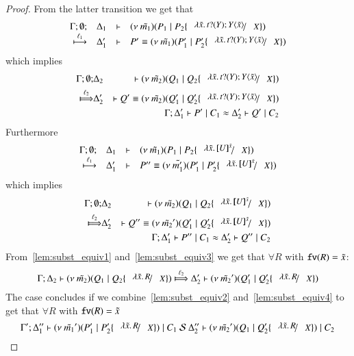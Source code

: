 \begin{proof}
	\noi From the latter transition we get that
%
\[
		\mhorel{\Gamma}{\Delta_1}{\newsp{\tilde{m_1}}{P_1 \Par P_2 \subst{\abs{\tilde{x}}{\binp{t}{Y} \appl{Y}{\tilde{x}}}}{X}}}
		{\hby{\ell_1}}{\Delta_1'}{P' \scong}{\newsp{\tilde{m_1}}{P_1' \Par P_2' \subst{\abs{\tilde{x}}{\binp{t}{Y} \appl{Y}{\tilde{x}}}}{X}}}
\]
%
	\noi which implies
%
	\begin{eqnarray}
		\Gamma; \es; &\Delta_2& \proves \newsp{\tilde{m_2}}{Q_1 \Par Q_2 \subst{\abs{\tilde{x}}{\binp{t}{Y} \appl{Y}{\tilde{x}}}}{X}} \nonumber \\
		\Hby{\ell_2}&
		\Delta_2'& \proves Q' \scong \newsp{\tilde{m_2}}{Q_1' \Par Q_2' \subst{\abs{\tilde{x}}{\binp{t}{Y} \appl{Y}{\tilde{x}}}}{X}}
		\label{lem:subst_equiv1}
		\\
		&&\horel{\Gamma}{\Delta_1'}{P' \Par C_1}{\wb}{\Delta_2'}{Q' \Par C_2} \label{lem:subst_equiv2}
	\end{eqnarray}
%
	\noi Furthermore
%
\[
	\mhorel{\Gamma}{\Delta_1}{\newsp{\tilde{m_1}}{P_1 \Par P_2 \subst{\abs{\tilde{x}}{\map{U}^{\tilde{x}}}}{X}}}{\hby{\ell_1}}
	{\Delta_1'}{P'' \scong}{\newsp{\tilde{m_1'}}{P_1' \Par P_2' \subst{\abs{\tilde{x}}{\map{U}^{\tilde{x}}}}{X}}}
\]
%
	\noi which implies
%
	\begin{eqnarray}
		\Gamma; \es; &\Delta_2& \proves \newsp{\tilde{m_2}}{Q_1 \Par Q_2 \subst{\abs{\tilde{x}}{\map{U}^{\tilde{x}}}}{X}} \nonumber \\
		\Hby{\ell_2} &\Delta_2'& \proves  Q'' \scong \newsp{\tilde{m_2}'}{Q_1' \Par Q_2' \subst{\abs{\tilde{x}}{\map{U}^{\tilde{x}}}}{X}}
		\label{lem:subst_equiv3}
		\\
		&&\horel{\Gamma}{\Delta_1'}{P'' \Par C_1}{\wb}{\Delta_2'}{Q'' \Par C_2} \label{lem:subst_equiv4}
	\end{eqnarray}
%
	\noi From~\ref{lem:subst_equiv1} and~\ref{lem:subst_equiv3} we get that $\forall R$ with $\mathtt{fv}(R) = \tilde{x}$:
%
	\[
		\horel{\Gamma}{\Delta_2}{\newsp{\tilde{m_2}}{Q_1 \Par Q_2 \subst{\abs{\tilde{x}}{R}}{X}}}
		{\Hby{\ell_2}}
		{\Delta_2'}{\newsp{\tilde{m_2}'}{Q_1' \Par Q_2' \subst{\abs{\tilde{x}}{R}}{X}}}
	\]
%
	\noi The case concludes if we combine~\ref{lem:subst_equiv2} and~\ref{lem:subst_equiv4} to get that $\forall R$ with $\mathtt{fv}(R) = \tilde{x}$
%
	\[
		\horel{\Gamma'}{\Delta_1''}{\newsp{\tilde{m_1}'}{P_1' \Par P_2' \subst{\abs{\tilde{x}}{R}}{X}} \Par C_1}
		{\ \mathcal{S}\ }
		{\Delta_2''}{\newsp{\tilde{m_2}'}{Q_1 \Par Q_2' \subst{\abs{\tilde{x}}{R}}{X}} \Par C_2}
	\]



\end{proof}
